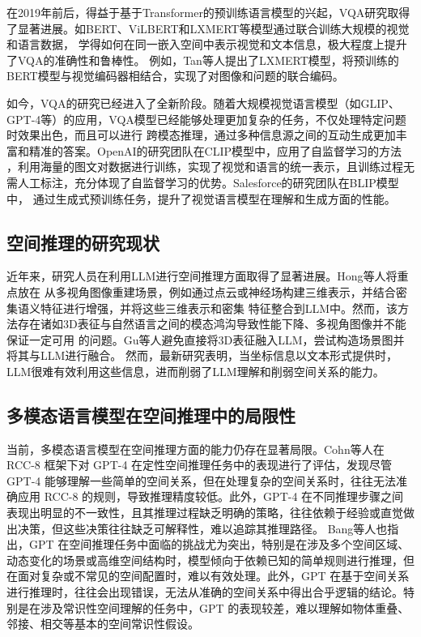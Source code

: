 在2019年前后，得益于基于Transformer的预训练语言模型的兴起，VQA研究取得了显著进展。如BERT、ViLBERT和LXMERT等模型通过联合训练大规模的视觉和语言数据，
学得如何在同一嵌入空间中表示视觉和文本信息，极大程度上提升了VQA的准确性和鲁棒性。
例如，Tan\cite{Tan2019LXMERT}等人提出了LXMERT模型，将预训练的BERT模型与视觉编码器相结合，实现了对图像和问题的联合编码。

如今，VQA的研究已经进入了全新阶段。随着大规模视觉语言模型（如GLIP、GPT-4等）的应用，VQA模型已经能够处理更加复杂的任务，不仅处理特定问题时效果出色，而且可以进行
跨模态推理，通过多种信息源之间的互动生成更加丰富和精准的答案。OpenAI的研究团队\cite{radford2021learning}在CLIP模型中，应用了自监督学习的方法
，利用海量的图文对数据进行训练，实现了视觉和语言的统一表示，且训练过程无需人工标注，充分体现了自监督学习的优势。Salesforce的研究团队\cite{li2022blip}在BLIP模型中，
通过生成式预训练任务，提升了视觉语言模型在理解和生成方面的性能。

\subsection{空间推理的研究现状}
近年来，研究人员在利用LLM进行空间推理方面取得了显著进展。Hong\cite{hong20233d}等人将重点放在
从多视角图像重建场景，例如通过点云或神经场构建三维表示，并结合密集语义特征进行增强，并将这些三维表示和密集
特征整合到LLM中。然而，该方法存在诸如3D表征与自然语言之间的模态鸿沟导致性能下降、多视角图像并不能保证一定可用
的问题。Gu\cite{gu2024conceptgraphs}等人避免直接将3D表征融入LLM，尝试构造场景图并将其与LLM进行融合。
然而，最新研究\cite{majumdar2024openeqa}表明，当坐标信息以文本形式提供时，LLM很难有效利用这些信息，进而削弱了LLM理解和削弱空间关系的能力。

\subsection{多模态语言模型在空间推理中的局限性}
当前，多模态语言模型在空间推理方面的能力仍存在显著局限。Cohn\cite{cohn2023evaluation}等人在 RCC-8 框架下对 GPT-4 在定性空间推理任务中的表现进行了评估，发现尽管 GPT-4 能够理解一些简单的空间关系，但在处理复杂的空间关系时，往往无法准确应用 RCC-8 的规则，导致推理精度较低。此外，GPT-4 在不同推理步骤之间表现出明显的不一致性，且其推理过程缺乏明确的策略，往往依赖于经验或直觉做出决策，但这些决策往往缺乏可解释性，难以追踪其推理路径。
Bang\cite{bang2023multitask}等人也指出，GPT 在空间推理任务中面临的挑战尤为突出，特别是在涉及多个空间区域、动态变化的场景或高维空间结构时，模型倾向于依赖已知的简单规则进行推理，但在面对复杂或不常见的空间配置时，难以有效处理。此外，GPT 在基于空间关系进行推理时，往往会出现错误，无法从准确的空间关系中得出合乎逻辑的结论。特别是在涉及常识性空间理解的任务中，GPT 的表现较差，难以理解如物体重叠、邻接、相交等基本的空间常识性假设。

